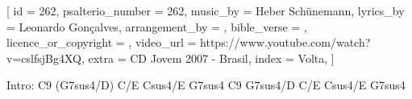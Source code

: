 [
    id                     = {262},
    psalterio_number       = {262},
    music_by               = {Heber Schünemann},
    lyrics_by              = {Leonardo Gonçalves},
    arrangement_by         = {},
    bible_verse            = {},
    licence_or_copyright   = {},
    video_url              = {https://www.youtube.com/watch?v=cslfsjBg4XQ},
    extra                  = {CD Jovem 2007 - Brasil},
    index 		             = {Volta},
]



\beginverse
Intro: 
C9 (G7sus4/D) C/E Csus4/E G7sus4
C9 G7sus4/D C/E Csus4/E G7sus4
\endverse



